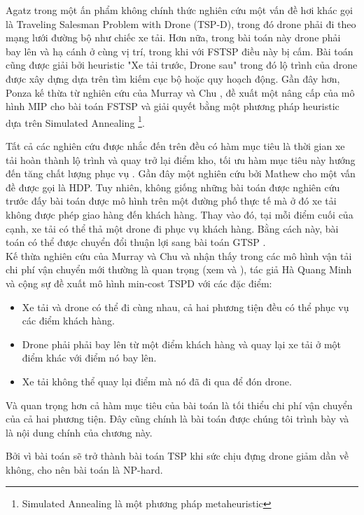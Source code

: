 \documentclass[a4paper,12pt]{report}
\begin{document}
Agatz \cite{13} trong một ấn phẩm không chính thức nghiên cứu một vấn đề hơi khác gọi là Traveling Salesman Problem with Drone (TSP-D), trong đó drone phải đi theo mạng lưới đường bộ như chiếc xe tải. Hơn nữa, trong bài toán này drone phải bay lên và hạ cánh ở cùng vị trí, trong khi với \ac{FSTSP} điều này bị cấm. Bài toán cũng  được giải bởi heuristic "Xe tải trước, Drone sau" trong đó lộ trình của drone được xây dựng dựa trên tìm kiếm cục bộ hoặc quy hoạch động. Gần đây hơn, Ponza \cite{14} kế thừa từ nghiên cứu của Murray và Chu \cite{12}, đề xuất một nâng cấp của mô hình \ac{MIP} cho bài toán \ac{FSTSP} và giải quyết bằng một phương pháp heuristic dựa trên Simulated Annealing \footnote{Simulated Annealing là một phương pháp metaheuristic}.

Tất cả các nghiên cứu được nhắc đến trên đều có hàm mục tiêu là thời gian xe tải hoàn thành lộ trình và quay trở lại điểm kho, tối ưu hàm mục tiêu này hướng đến tăng chất lượng phục vụ \cite{16}. Gần đây một nghiên cứu bởi Mathew \cite{19} cho một vấn đề được gọi là \ac{HDP}. Tuy nhiên, không giống những bài toán được nghiên cứu trước đấy bài toán được mô hình trên một đường phố thực tế mà ở đó xe tải không được phép giao hàng đến khách hàng. Thay vào đó, tại mỗi điểm cuối của cạnh, xe tải có thể thả một drone đi phục vụ khách hàng. Bằng cách này, bài toán có thể được chuyển đổi thuận lợi sang bài toán  \ac{GTSP} \cite{21}.\\

Kế thừa nghiên cứu của Murray và Chu \cite{12} và nhận thấy trong các mô hình vận tải chi phí vận chuyển mới thường là quan trọng (xem \cite{17} và \cite{18}), tác giả Hà Quang Minh và cộng sự đề xuất mô hình min-cost TSPD \cite{main} với các đặc điểm: \begin{itemize}
\item Xe tải và drone có thể đi cùng nhau, cả hai phương tiện đều có thể phục vụ các điểm khách hàng.
\item Drone phải phải bay lên từ một điểm khách hàng và quay lại xe tải ở một điểm khác với điểm nó bay lên.
\item Xe tải không thể quay lại điểm mà nó đã đi qua để đón drone.
\end{itemize}
Và quan trọng hơn cả hàm mục tiêu của bài toán là tối thiểu chi phí vận chuyển của cả hai phương tiện. Đây cũng chính là bài toán được chúng tôi trình bày và là nội dung chính của chương này. 

Bởi vì bài toán sẽ trở thành bài toán TSP khi sức chịu đựng drone giảm dần về không, cho nên bài toán là NP-hard. 
\end{document}
